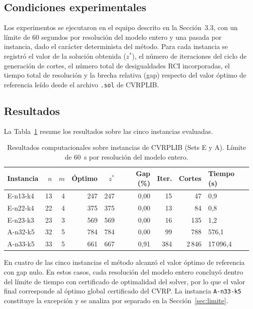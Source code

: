 \subsection{Condiciones experimentales}

Los experimentos se ejecutaron en el equipo descrito en la Sección~3.3, con un
límite de 60 segundos por resolución del modelo entero y una pasada por
instancia, dado el carácter determinista del método. Para cada instancia se
registró el valor de la solución obtenida ($z^{*}$), el número de iteraciones
del ciclo de generación de cortes, el número total de desigualdades RCI
incorporadas, el tiempo total de resolución y la brecha relativa (gap) respecto
del valor óptimo de referencia leído desde el archivo \texttt{.sol} de CVRPLIB.

\subsection{Resultados}

La Tabla~\ref{tab:resultados} resume los resultados sobre las cinco instancias
evaluadas.

\begin{table}[H]
\centering
\caption{Resultados computacionales sobre instancias de CVRPLIB (Sets E y A).
Límite de 60~s por resolución del modelo entero.}
\label{tab:resultados}
\begin{tabular}{lrrrrrrrl}
\hline
Instancia & $n$ & $m$ & Óptimo & $z^{*}$ & Gap (\%) & Iter. & Cortes & Tiempo (s) \\
\hline
E-n13-k4 & 13 & 4 & 247 & 247 & 0{,}00 & 15  & 47     & 0{,}9 \\
E-n22-k4 & 22 & 4 & 375 & 375 & 0{,}00 & 13  & 84     & 0{,}8 \\
E-n23-k3 & 23 & 3 & 569 & 569 & 0{,}00 & 16  & 135    & 1{,}2 \\
A-n32-k5 & 32 & 5 & 784 & 784 & 0{,}00 & 99  & 788    & 576{,}1 \\
A-n33-k5 & 33 & 5 & 661 & 667 & 0{,}91 & 384 & 2\,846 & 17\,096{,}4 \\
\hline
\end{tabular}
\end{table}

En cuatro de las cinco instancias el método alcanzó el valor óptimo de
referencia con gap nulo. En estos casos, cada resolución del modelo entero
concluyó dentro del límite de tiempo con certificado de optimalidad del solver,
por lo que el valor final corresponde al óptimo global certificado del CVRP.
La instancia \texttt{A-n33-k5} constituye la excepción y se analiza por
separado en la Sección~\ref{sec:limite}.

